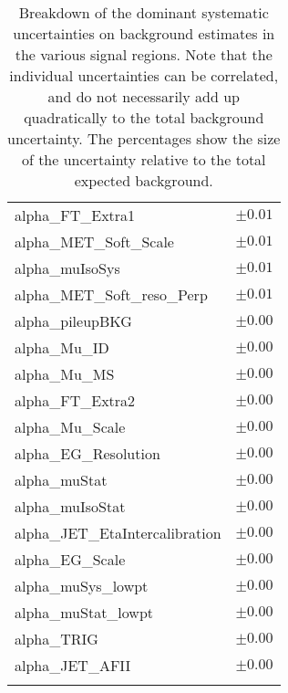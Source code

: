 \begin{table}
\begin{center}
\begin{tabular*}{\textwidth}{@{\extracolsep{\fill}}lc}
alpha\_FT\_Extra1         & $\pm 0.01$       \\
alpha\_MET\_Soft\_Scale         & $\pm 0.01$       \\
alpha\_muIsoSys         & $\pm 0.01$       \\
alpha\_MET\_Soft\_reso\_Perp         & $\pm 0.01$       \\
alpha\_pileupBKG         & $\pm 0.00$       \\
alpha\_Mu\_ID         & $\pm 0.00$       \\
alpha\_Mu\_MS         & $\pm 0.00$       \\
alpha\_FT\_Extra2         & $\pm 0.00$       \\
alpha\_Mu\_Scale         & $\pm 0.00$       \\
alpha\_EG\_Resolution         & $\pm 0.00$       \\
alpha\_muStat         & $\pm 0.00$       \\
alpha\_muIsoStat         & $\pm 0.00$       \\
alpha\_JET\_EtaIntercalibration         & $\pm 0.00$       \\
alpha\_EG\_Scale         & $\pm 0.00$       \\
alpha\_muSys\_lowpt         & $\pm 0.00$       \\
alpha\_muStat\_lowpt         & $\pm 0.00$       \\
alpha\_TRIG         & $\pm 0.00$       \\
alpha\_JET\_AFII         & $\pm 0.00$       \\
\noalign{\smallskip}\hline\noalign{\smallskip}
\end{tabular*}
\end{center}
\caption[Breakdown of uncertainty on background estimates]{
Breakdown of the dominant systematic uncertainties on background estimates in the various signal regions.
Note that the individual uncertainties can be correlated, and do not necessarily add up quadratically to 
the total background uncertainty. The percentages show the size of the uncertainty relative to the total expected background.
\label{table.results.bkgestimate.uncertainties.SR0b2}}
\end{table}
\clearpage
%
